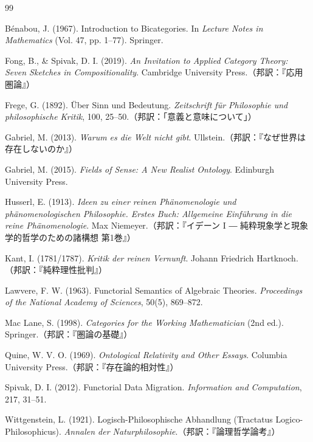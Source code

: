 \documentclass[11pt,a4paper,luatex]{jlreq}
\theoremstyle{definition}
\theoremstyle{plain}
\begin{document}
\begin{thebibliography}{99}

B\'enabou, J. (1967). Introduction to Bicategories. In \textit{Lecture Notes in Mathematics} (Vol. 47, pp. 1--77). Springer.

Fong, B., \& Spivak, D. I. (2019). \textit{An Invitation to Applied Category Theory: Seven Sketches in Compositionality}. Cambridge University Press.（邦訳：『応用圏論』）

Frege, G. (1892). \"Uber Sinn und Bedeutung. \textit{Zeitschrift f\"ur Philosophie und philosophische Kritik}, 100, 25--50.（邦訳：「意義と意味について」）

Gabriel, M. (2013). \textit{Warum es die Welt nicht gibt}. Ullstein.（邦訳：『なぜ世界は存在しないのか』）

Gabriel, M. (2015). \textit{Fields of Sense: A New Realist Ontology}. Edinburgh University Press.

Husserl, E. (1913). \textit{Ideen zu einer reinen Ph\"anomenologie und ph\"anomenologischen Philosophie. Erstes Buch: Allgemeine Einf\"uhrung in die reine Ph\"anomenologie}. Max Niemeyer.（邦訳：『イデーン I ― 純粋現象学と現象学的哲学のための諸構想 第1巻』）

Kant, I. (1781/1787). \textit{Kritik der reinen Vernunft}. Johann Friedrich Hartknoch.（邦訳：『純粋理性批判』）

Lawvere, F. W. (1963). Functorial Semantics of Algebraic Theories. \textit{Proceedings of the National Academy of Sciences}, 50(5), 869--872.

Mac Lane, S. (1998). \textit{Categories for the Working Mathematician} (2nd ed.). Springer.（邦訳：『圏論の基礎』）

Quine, W. V. O. (1969). \textit{Ontological Relativity and Other Essays}. Columbia University Press.（邦訳：『存在論的相対性』）

Spivak, D. I. (2012). Functorial Data Migration. \textit{Information and Computation}, 217, 31--51.

Wittgenstein, L. (1921). Logisch-Philosophische Abhandlung (Tractatus Logico-Philosophicus). \textit{Annalen der Naturphilosophie}.（邦訳：『論理哲学論考』）

\end{thebibliography}
\end{document}
